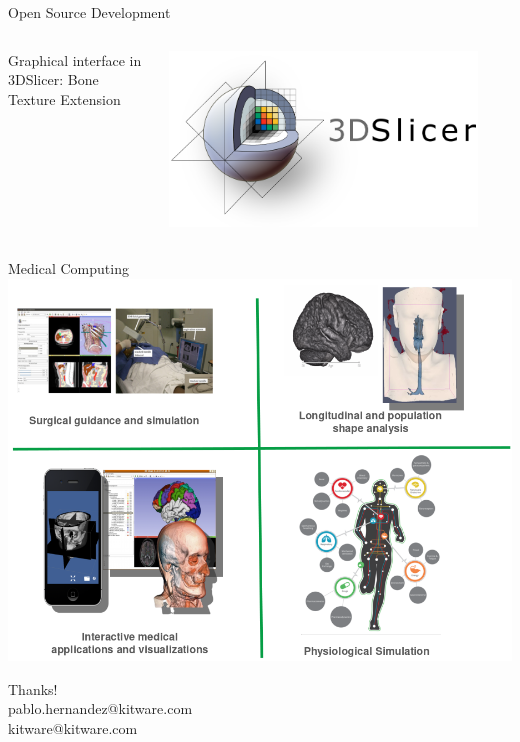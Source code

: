 \documentclass[10pt,aspectratio=169]{beamer}
\begin{document}
{\begin{frame}{Open Source Development}
  \begin{columns}[onlytextwidth]
    \begin{block}{Graphical interface in 3DSlicer: Bone Texture Extension}
    \end{block}
    \centering
    \includegraphics[width=0.9\textwidth]{./logos/logo_slicer_horizontal.png}
  \end{columns}
\end{frame}

{
\begin{frame}{Medical Computing}
    \centering
    \includegraphics[height=0.9\textheight]{./logos/kitware_medical.png}
\end{frame}
}

\begin{frame}[standout]
  \centering
  {\huge Thanks!}\\
  pablo.hernandez@kitware.com\\
  kitware@kitware.com
  \vspace{1cm}
\end{frame}

}
\end{document}
